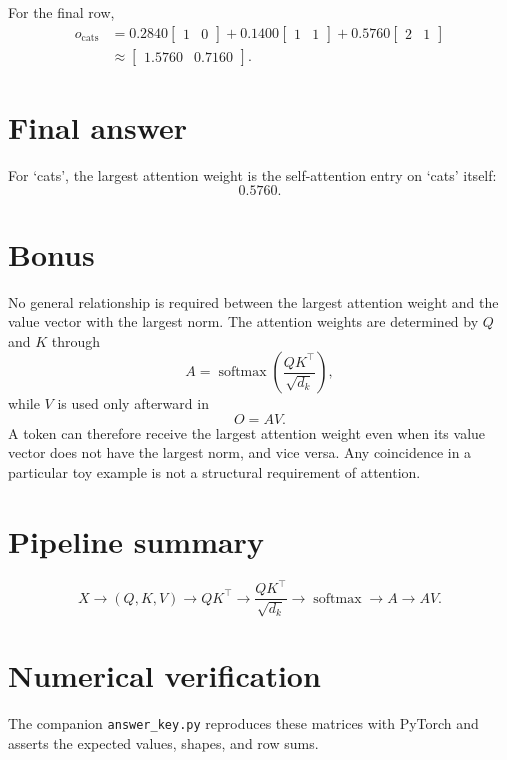 \documentclass[11pt]{article}
\newcommand{\softmax}{\operatorname{softmax}}
\begin{document}
For the final row,
\[
\begin{aligned}
o_{\mathrm{cats}}
&=0.2840\begin{bmatrix}1&0\end{bmatrix}
+0.1400\begin{bmatrix}1&1\end{bmatrix}
+0.5760\begin{bmatrix}2&1\end{bmatrix}\\
&\approx\begin{bmatrix}1.5760&0.7160\end{bmatrix}.
\end{aligned}
\]

\section*{Final answer}

For `cats', the largest attention weight is the self-attention entry on `cats' itself:
\[
\boxed{0.5760}.
\]

\section*{Bonus}

No general relationship is required between the largest attention weight and the value vector with the largest norm. The attention weights are determined by $Q$ and $K$ through
\[
A=\softmax\left(\frac{QK^\top}{\sqrt{d_k}}\right),
\]
while $V$ is used only afterward in
\[
O=AV.
\]
A token can therefore receive the largest attention weight even when its value vector does not have the largest norm, and vice versa. Any coincidence in a particular toy example is not a structural requirement of attention.

\section*{Pipeline summary}

\[
X\longrightarrow(Q,K,V)
\longrightarrow QK^\top
\longrightarrow \frac{QK^\top}{\sqrt{d_k}}
\longrightarrow \softmax
\longrightarrow A
\longrightarrow AV.
\]

\section*{Numerical verification}

The companion \texttt{answer\_key.py} reproduces these matrices with PyTorch and asserts the expected values, shapes, and row sums.
\end{document}
